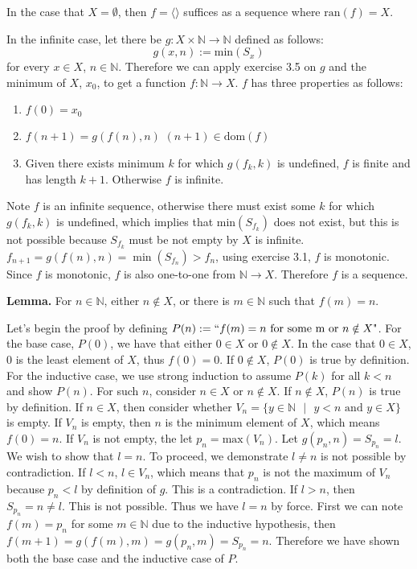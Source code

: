 \documentclass{article}
\newcommand{ \dom }[0]{\text{dom}}
\begin{document}
\begin{enumerate}
				In the case that $X = \emptyset$, then $f = \langle \rangle$ suffices as a sequence where $\text{ran}(f) = X$.
				
				In the infinite case, let there be $g: X \times \mathbb{N} \xrightarrow{} \mathbb{N}$ defined as follows: $$g(x, n) := \text{min}(S_x)$$ for every $x \in X$, $n \in \mathbb{N}$. Therefore we can apply exercise 3.5 on $g$ and the minimum of $X$, $x_0$, to get a function $f: \mathbb{N} \xrightarrow{} X$. $f$ has three properties as follows:
				
				\begin{enumerate}
					\item $f(0) = x_0$
					\item $f(n + 1) = g(f(n), n)$  $(n + 1) \in \dom(f)$
					\item Given there exists minimum $k$ for which $g(f_k, k)$ is undefined, $f$ is finite and has length $k + 1$. Otherwise $f$ is infinite.
				\end{enumerate}				
		   		
				Note $f$ is an infinite sequence, otherwise there must exist some $k$ for which $g(f_k, k)$ is undefined, which implies that $\text{min}(S_{f_k})$ does not exist, but this is not possible because $S_{f_k}$ must be not empty by $X$ is infinite. $f_{n + 1} = g(f(n), n) = \min(S_{f_{n}}) > f_{n}$, using exercise 3.1, $f$ is monotonic. Since $f$ is monotonic, $f$ is also one-to-one from $\mathbb{N} \xrightarrow{} X$. Therefore $f$ is a sequence. 
				 
				\medskip
				\textbf{Lemma.} For $n \in \mathbb{N}$, either $n \notin X$, or there is $m \in \mathbb{N}$ such that $f(m) = n$.
				
				
				\medskip
				Let's begin the proof by defining $P(n) := ``f(m) = n \text{ for some m or } n \notin X\text{"}$.
				For the base case, $P(0)$, we have that either $0 \in X$ or $0 \notin X$. In the case that $0 \in X$, $0$ is the least element of $X$, thus $f(0) = 0$. If $0 \notin X$, $P(0)$ is true by definition. For the inductive case, we use strong induction to assume $P(k)$ for all $k < n$ and show $P(n)$. For such $n$, consider $n \in X$ or $n \notin X$. If $n \notin X$, $P(n)$ is true by definition. If $n \in X$, then consider whether $V_n = \{y \in \mathbb{N} \text{ } | \text{ }  y < n \text{ and } y \in X\}$ is empty. If $V_n$ is empty, then $n$ is the minimum element of $X$, which means $f(0) = n$. If $V_n$ is not empty, the let $p_n = \text{max}(V_n)$. Let $g(p_n, n) = S_{p_n} = l$. We wish to show that $l = n$. To proceed, we demonstrate $l \neq n$ is not possible by contradiction. If $l < n$, $l \in V_n$, which means that $p_n$ is not the maximum of $V_n$ because $p_n < l$ by definition of $g$. This is a contradiction. If $l > n$, then $S_{p_n} = n \neq l$. This is not possible. Thus we have $l = n$ by force. First we can note $f(m) = p_n$ for some $m \in \mathbb{N}$ due to the inductive hypothesis, then $f(m + 1) = g(f(m), m) = g(p_{n}, m) = S_{p_n} = n$. Therefore we have shown both the base case and the inductive case of $P$.
				

\end{enumerate}
\end{document}
